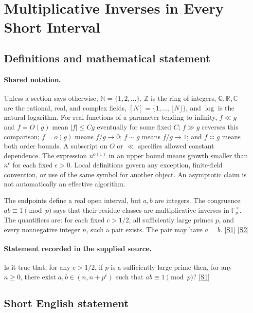 \documentclass[11pt,a4paper]{article}
\newcommand{\N}{\mathbb{N}}
\newcommand{\Z}{\mathbb{Z}}
\newcommand{\Q}{\mathbb{Q}}
\newcommand{\R}{\mathbb{R}}
\newcommand{\C}{\mathbb{C}}
\newcommand{\sref}[2]{\hyperlink{source:#1:#2}{[S#2]}}
\begin{document}
\section{Multiplicative Inverses in Every Short Interval}\label{statement}


\subsection{Definitions and mathematical statement}

\paragraph{Shared notation.}Unless a section says otherwise, $\N=\{1,2,\ldots\}$,
$\Z$ is the ring of integers, $\Q,\R,\C$ are the rational, real, and complex
fields, $[N]=\{1,\ldots,\lfloor N\rfloor\}$, and $\log$ is the natural
logarithm. For real functions of a parameter tending to infinity,
$f\ll g$ and $f=O(g)$ mean $|f|\leq Cg$ eventually for some fixed $C$;
$f\gg g$ reverses this comparison; $f=o(g)$ means $f/g\to0$;
$f\sim g$ means $f/g\to1$; and $f\asymp g$ means both order bounds.
A subscript on $O$ or $\ll$ specifies allowed constant dependence.
The expression $n^{o(1)}$ in an upper bound means growth smaller than
$n^\epsilon$ for each fixed $\epsilon>0$. Local definitions govern any
exception, finite-field convention, or use of the same symbol for another
object. An asymptotic claim is not automatically an effective algorithm.



The endpoints define a real open interval, but $a,b$ are integers. The congruence $ab\equiv1\pmod p$ says that their residue classes are multiplicative inverses in $\mathbb F_p^\times$. The quantifiers are: for each fixed $c>1/2$, all sufficiently large primes $p$, and every nonnegative integer $n$, such a pair exists. The pair may have $a=b$. \sref{statement}{1} \sref{statement}{2}

\paragraph{Statement recorded in the supplied source.}
Is it true that, for any $c>1/2$, if $p$ is a sufficiently large prime then, for any $n\geq 0$, there exist $a,b\in(n,n+p^c)$ such that $ab\equiv 1\pmod{p}$? \sref{statement}{1}

\subsection{Short English statement}
\end{document}
